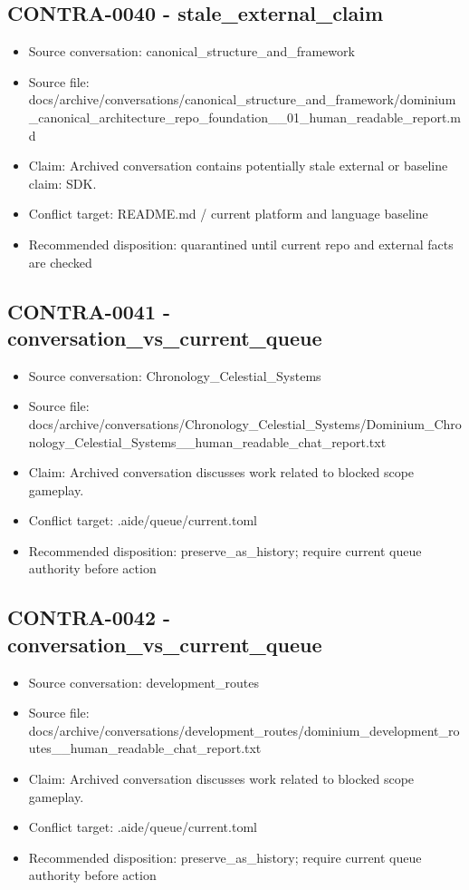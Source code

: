 \documentclass[11pt,a4paper]{report}
\begin{document}
\subsection{CONTRA-0040 - stale\_external\_claim}

\begin{itemize}
\item Source conversation: canonical\_structure\_and\_framework
\item Source file: docs/archive/conversations/canonical\_structure\_and\_framework/dominium\_canonical\_architecture\_repo\_foundation\_\_01\_human\_readable\_report.md
\item Claim: Archived conversation contains potentially stale external or baseline claim: SDK.
\item Conflict target: README.md / current platform and language baseline
\item Recommended disposition: quarantined until current repo and external facts are checked
\end{itemize}

\subsection{CONTRA-0041 - conversation\_vs\_current\_queue}

\begin{itemize}
\item Source conversation: Chronology\_Celestial\_Systems
\item Source file: docs/archive/conversations/Chronology\_Celestial\_Systems/Dominium\_Chronology\_Celestial\_Systems\_\_human\_readable\_chat\_report.txt
\item Claim: Archived conversation discusses work related to blocked scope gameplay.
\item Conflict target: .aide/queue/current.toml
\item Recommended disposition: preserve\_as\_history; require current queue authority before action
\end{itemize}

\subsection{CONTRA-0042 - conversation\_vs\_current\_queue}

\begin{itemize}
\item Source conversation: development\_routes
\item Source file: docs/archive/conversations/development\_routes/dominium\_development\_routes\_\_human\_readable\_chat\_report.txt
\item Claim: Archived conversation discusses work related to blocked scope gameplay.
\item Conflict target: .aide/queue/current.toml
\item Recommended disposition: preserve\_as\_history; require current queue authority before action
\end{itemize}
\end{document}
